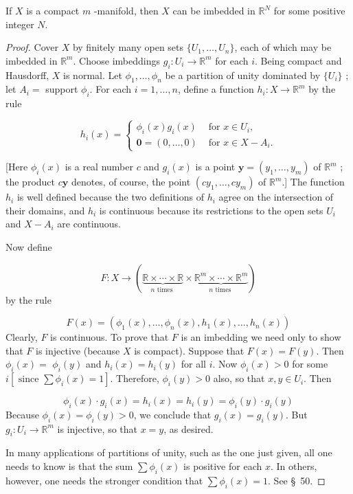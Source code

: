 \begin{theorem}
\label{thm:\thetheorem}
 If \(X\) is a compact \(m\) -manifold, then \(X\) can be imbedded in \(\mathbb{R}^{N}\) for some positive integer \(N\).

\end{theorem}
\begin{proof}
 Cover \(X\) by finitely many open sets \(\{ {U_{1},\ldots ,U_{n}}\}\), each of which may be imbedded in \(\mathbb{R}^{m}\). Choose imbeddings \(g_{i} : U_{i} \rightarrow {\mathbb{R}}^{m}\) for each \(i\). Being compact and Hausdorff, \(X\) is normal. Let \({\phi }_{1},\ldots ,{\phi }_{n}\) be a partition of unity dominated by \(\{ U_{i}\}\) ; let \(A_{i} =\) support \({\phi }_{i}\). For each \(i = 1,\ldots, n\), define a function \(h_{i} : X \rightarrow {\mathbb{R}}^{m}\) by the rule

\[
h_{i}(x) = \left\{ \begin{array}{ll} {\phi }_{i}(x) g_{i}(x) & \text{ for }x \in {U}_{i}, \\ \mathbf{0} = ( {0,\ldots, 0}) & \text{ for }x \in X - A_{i}. \end{array}\right.
\]

[Here \({\phi }_{i}(x)\) is a real number \(c\) and \(g_{i}(x)\) is a point \(\mathbf{y} = ( {y_{1},\ldots ,y_{m}})\) of \(\mathbb{R}^{m}\) ; the product \(c\mathbf{y}\) denotes, of course, the point \(( {cy_{1},\ldots, cy_{m}})\) of \(\mathbb{R}^{m}\).] The function \(h_{i}\) is well defined because the two definitions of \(h_{i}\) agree on the intersection of their domains, and \(h_{i}\) is continuous because its restrictions to the open sets \(U_{i}\) and \(X - A_{i}\) are continuous.

Now define

\[
F : X \rightarrow ( {\underset{n\text{ times }}{\underbrace{\mathbb{R} \times \cdots \times \mathbb{R}}} \times \underset{n\text{ times }}{\underbrace{\mathbb{R}^{m} \times \cdots \times {\mathbb{R}}^{m}}}})
\]
by the rule

\[
F(x) = ( {{\phi }_{1}(x),\ldots ,{\phi }_{n}(x),h_{1}(x),\ldots ,h_{n}(x) })
\]
Clearly, \(F\) is continuous. To prove that \(F\) is an imbedding we need only to show that \(F\) is injective (because \(X\) is compact). Suppose that \(F(x) = F( y)\). Then \({\phi }_{i}(x) =\) \({\phi }_{i}( y)\) and \(h_{i}(x) = h_{i}( y)\) for all \(i\). Now \({\phi }_{i}(x) > 0\) for some \(i[ {\text{ since }\sum {\phi }_{i}(x) = 1}]\). Therefore, \({\phi }_{i}( y) > 0\) also, so that \(x,y \in {U}_{i}\). Then

\[
{\phi }_{i}(x) \cdot {g}_{i}(x) = h_{i}(x) = h_{i}( y) = {\phi }_{i}( y) \cdot {g}_{i}( y)
\]
Because \({\phi }_{i}(x) = {\phi }_{i}( y) > 0\), we conclude that \(g_{i}(x) = g_{i}( y)\). But \(g_{i} : U_{i} \rightarrow {\mathbb{R}}^{m}\) is injective, so that \(x = y\), as desired.

In many applications of partitions of unity, such as the one just given, all one needs to know is that the sum \(\sum {\phi }_{i}(x)\) is positive for each \(x\). In others, however, one needs the stronger condition that \(\sum {\phi }_{i}(x) = 1\). See \S\ 50.
\end{proof}

